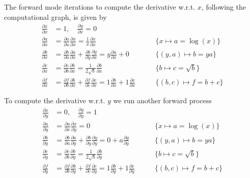 The forward mode iterations to compute the derivative w.r.t. \(x\),
following the computational graph, is given by
\begin{align*}
  \frac{\partial x}{\partial x} &= 1, \quad
  \frac{\partial y}{\partial x} = 0\\
  \frac{\partial a}{\partial x} &=
  \frac{\partial a}{\partial x} \frac{\partial x}{\partial x} =
  \frac{1}{x} \frac{\partial x}{\partial x} \qquad
  &\{x \mapsto a = \log(x)\}\\
  \frac{\partial b}{\partial x} &=
  \frac{\partial b}{\partial a} \frac{\partial a}{\partial x} +
  \frac{\partial b}{\partial y} \frac{\partial y}{\partial x} =
  y \frac{\partial a}{\partial x} + 0 \qquad
  &\{(y, a) \mapsto b = ya\}\\
  \frac{\partial c}{\partial x} &=
  \frac{\partial c}{\partial b} \frac{\partial b}{\partial x} =
  \frac{1}{2\sqrt{b}} \frac{\partial b}{\partial x} \qquad
  &\{b \mapsto c = \sqrt{b}\}\\
  \frac{\partial f}{\partial x} &=
  \frac{\partial f}{\partial b} \frac{\partial b}{\partial x} +
  \frac{\partial f}{\partial c} \frac{\partial c}{\partial x} =
  1 \frac{\partial b}{\partial x} + 1 \frac{\partial c}{\partial x}
  \qquad &\{(b, c) \mapsto f = b + c\}
\end{align*}

To compute the derivative w.r.t. \(y\) we run another forward process
\begin{align*}
  \frac{\partial x}{\partial y} &= 0, \quad
  \frac{\partial y}{\partial y} = 1\\
  \frac{\partial a}{\partial y} &=
  \frac{\partial a}{\partial x} \frac{\partial x}{\partial y} = 0 \qquad
  &\{x \mapsto a = \log(x)\}\\
  \frac{\partial b}{\partial y} &=
  \frac{\partial b}{\partial a} \frac{\partial a}{\partial y} +
  \frac{\partial b}{\partial y} \frac{\partial y}{\partial y} =
  0 + a \frac{\partial y}{\partial y}\qquad
  &\{(y, a) \mapsto b = ya\}\\
  \frac{\partial c}{\partial y} &=
  \frac{\partial c}{\partial b} \frac{\partial b}{\partial y} =
  \frac{1}{2\sqrt{b}} \frac{\partial b}{\partial y} \qquad
  &\{b \mapsto c = \sqrt{b}\}\\
  \frac{\partial f}{\partial y} &=
  \frac{\partial f}{\partial b} \frac{\partial b}{\partial y} +
  \frac{\partial f}{\partial c} \frac{\partial c}{\partial y} =
  1 \frac{\partial b}{\partial y} + 1 \frac{\partial c}{\partial y}
  \qquad &\{(b, c) \mapsto f = b + c\}
\end{align*}

